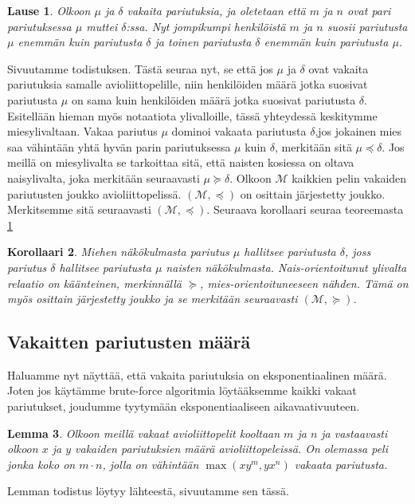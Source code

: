 \documentclass[finnish]{tktltiki2}
\newtheorem{lau}{Lause}
\newtheorem{lem}[lau]{Lemma}
\newtheorem{kor}[lau]{Korollaari}
\theoremstyle{definition}
\theoremstyle{remark}
\begin{document}
\begin{lau} \cite[p. 18]{gusfield1989stable}\label{lause-guspref}
	Olkoon $\mu$ ja $\delta$ vakaita pariutuksia, ja oletetaan että $m$ ja $n$ ovat pari pariutuksessa $\mu$ muttei $\delta$:ssa. Nyt jompikumpi henkilöistä $m$ ja $n$ suosii pariutusta $\mu$ enemmän kuin pariutusta $\delta$ ja toinen pariutusta $\delta$ enemmän kuin pariutusta $\mu$.
\end{lau}
Sivuutamme todistuksen.
Tästä seuraa nyt, se että jos $\mu$ ja $\delta$ ovat vakaita pariutuksia samalle avioliittopelille, niin henkilöiden määrä jotka suosivat pariutusta $\mu$ on sama kuin henkilöiden määrä jotka suosivat pariutusta $\delta$.
Esitellään hieman myös notaatiota ylivalloille, tässä yhteydessä keskitymme miesylivaltaan.
Vakaa pariutus $\mu$ dominoi vakaata pariutusta $\delta$,jos jokainen mies saa vähintään yhtä hyvän parin pariutuksessa $\mu$ kuin $\delta$, merkitään sitä $\mu \preceq \delta$.
Jos meillä on miesylivalta se tarkoittaa sitä, että naisten kosiessa on oltava naisylivalta, joka merkitään seuraavasti $\mu \succeq \delta$. Olkoon $\mathcal{M}$ kaikkien pelin vakaiden pariutusten joukko avioliittopelissä. $(\mathcal{M}, \preceq)$ on osittain järjestetty joukko.  Merkitsemme sitä seuraavasti $(\mathcal{M}, \preceq)$.
Seuraava korollaari seuraa teoreemasta \ref{lause-guspref}

\begin{kor}
Miehen näkökulmasta pariutus $\mu$ hallitsee pariutusta $\delta$, joss pariutus $\delta$ hallitsee pariutusta $\mu$ naisten näkökulmasta. \emph{Nais-orientoitunut} ylivalta relaatio on käänteinen, merkinnällä $\succeq$, mies-orientoituneeseen nähden. Tämä on myös osittain järjestetty joukko ja se merkitään seuraavasti $(\mathcal{M}, \succeq)$. 
\end{kor}

\subsection{Vakaitten pariutusten määrä}
Haluamme nyt näyttää, että vakaita pariutuksia on eksponentiaalinen määrä. Joten jos käytämme brute-force algoritmia löytääksemme kaikki vakaat pariutukset, joudumme tyytymään eksponentiaaliseen aikavaativuuteen.

\begin{lem} \cite[p. 23]{gusfield1989stable} \label{lemma-koko}
Olkoon meillä vakaat avioliittopelit kooltaan $m$ ja $n$ ja vastaavasti olkoon $x$ ja $y$ vakaiden pariutuksien määrä avioliittopeleissä. On olemassa peli jonka koko on $m \cdot n$, jolla on vähintään $\max(xy^m, yx^n)$ vakaata pariutusta.
\end{lem}
Lemman todistus löytyy lähteestä, sivuutamme sen tässä.
\end{document}
